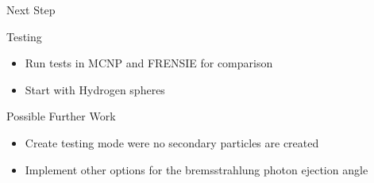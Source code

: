 \documentclass{beamer}
\begin{document}
\begin{frame}{Next Step}
  
  \begin{block}{Testing}
    \begin{itemize}
      \item Run tests in MCNP and FRENSIE for comparison
      \item Start with Hydrogen spheres
    \end{itemize}
  \end{block}
  
    \begin{block}{Possible Further Work}
    \begin{itemize}
      \item Create testing mode were no secondary particles are created
      \item Implement other options for the bremsstrahlung photon ejection angle
    \end{itemize}
  \end{block}

\end{frame}
\end{document}
